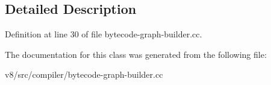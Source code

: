 \subsection{Detailed Description}


Definition at line 30 of file bytecode-\/graph-\/builder.\+cc.



The documentation for this class was generated from the following file\+:\begin{DoxyCompactItemize}
\item 
v8/src/compiler/bytecode-\/graph-\/builder.\+cc\end{DoxyCompactItemize}
